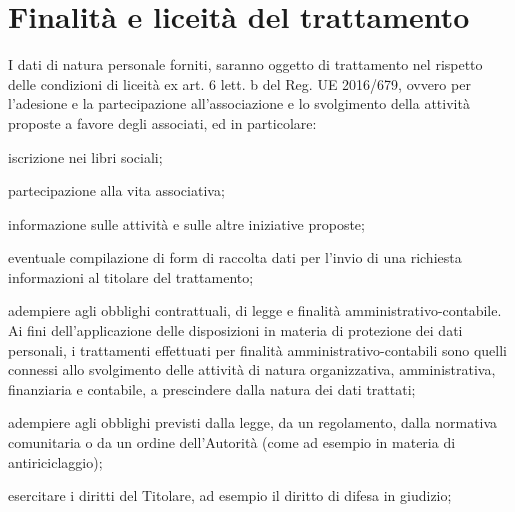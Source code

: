 \documentclass[legalpaper, 11pt]{exam}
\let\tempone\enumerate
\let\temptwo\endenumerate
\renewenvironment{enumerate}{\tempone\addtolength{\itemsep}{-0.45\baselineskip}}{\temptwo}
\begin{document}
{\section{Finalità e liceità del trattamento}\label{sec:finalita}
I dati di natura personale forniti, saranno oggetto di trattamento nel rispetto delle condizioni di liceità ex art. 6 lett. b del Reg. UE 2016/679, ovvero per l’adesione e la partecipazione all’associazione e lo svolgimento della attività proposte a favore degli associati, ed in particolare:
\begin{enumerate}
	\item  iscrizione nei libri sociali;
	\item  partecipazione alla vita associativa;
	\item  informazione sulle attività e sulle altre iniziative proposte;
	\item  eventuale compilazione di form di raccolta dati per l’invio di una richiesta informazioni al titolare del trattamento;
	\item  adempiere agli obblighi contrattuali, di legge e finalità amministrativo-contabile. Ai fini dell’applicazione delle disposizioni in materia di protezione dei dati personali, i trattamenti effettuati per finalità amministrativo-contabili sono quelli connessi allo svolgimento delle attività di natura organizzativa, amministrativa, finanziaria e contabile, a prescindere dalla natura dei dati trattati;
	\item adempiere agli obblighi previsti dalla legge, da un regolamento, dalla normativa comunitaria o da un ordine dell’Autorità (come ad esempio in materia di antiriciclaggio);
	\item esercitare i diritti del Titolare, ad esempio il diritto di difesa in giudizio;
\end{enumerate}

}
\end{document}

